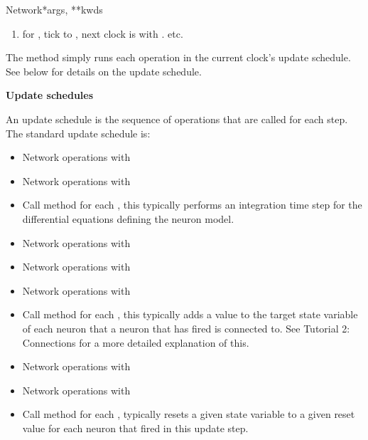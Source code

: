 \documentclass[letterpaper,10pt,english]{manual}
\begin{document}
\begin{classdesc}{Network}{*args, **kwds}
\begin{enumerate}
\item {} 
 for , tick  to , next
clock is  with . etc.

\end{enumerate}

The  method simply runs each operation in the current clock's
update schedule. See below for details on the update schedule.

\textbf{Update schedules}

An update schedule is the sequence of operations that are
called for each  step. The standard update schedule is:
\begin{itemize}
\item {} 
Network operations with 

\item {} 
Network operations with 

\item {} 
Call  method for each \hyperlink{brian.NeuronGroup}{}, this typically
performs an integration time step for the differential equations
defining the neuron model.

\item {} 
Network operations with 

\item {} 
Network operations with 

\item {} 
Network operations with 

\item {} 
Call  method for each \hyperlink{brian.Connection}{}, this
typically adds a value to the target state variable of each neuron
that a neuron that has fired is connected to. See Tutorial 2: Connections for
a more detailed explanation of this.

\item {} 
Network operations with 

\item {} 
Network operations with 

\item {} 
Call  method for each \hyperlink{brian.NeuronGroup}{}, typically resets a
given state variable to a given reset value for each neuron that fired
in this update step.


\end{itemize}
\end{classdesc}
\end{document}
